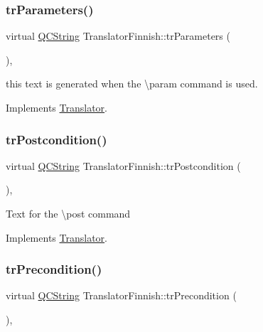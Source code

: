 \subsubsection{\texorpdfstring{trParameters()}{trParameters()}}
{\footnotesize\ttfamily virtual \mbox{\hyperlink{class_q_c_string}{Q\+C\+String}} Translator\+Finnish\+::tr\+Parameters (\begin{DoxyParamCaption}{ }\end{DoxyParamCaption})\hspace{0.3cm}{\ttfamily [inline]}, {\ttfamily [virtual]}}

this text is generated when the \textbackslash{}param command is used. 

Implements \mbox{\hyperlink{class_translator}{Translator}}.

\mbox{\label{class_translator_finnish_a3c86b722a288212c7c72bf96f4942250}} 
\subsubsection{\texorpdfstring{trPostcondition()}{trPostcondition()}}
{\footnotesize\ttfamily virtual \mbox{\hyperlink{class_q_c_string}{Q\+C\+String}} Translator\+Finnish\+::tr\+Postcondition (\begin{DoxyParamCaption}{ }\end{DoxyParamCaption})\hspace{0.3cm}{\ttfamily [inline]}, {\ttfamily [virtual]}}

Text for the \textbackslash{}post command 

Implements \mbox{\hyperlink{class_translator}{Translator}}.

\mbox{\label{class_translator_finnish_aa303b9aa448b18515e9e79b4a0a6c924}} 
\subsubsection{\texorpdfstring{trPrecondition()}{trPrecondition()}}
{\footnotesize\ttfamily virtual \mbox{\hyperlink{class_q_c_string}{Q\+C\+String}} Translator\+Finnish\+::tr\+Precondition (\begin{DoxyParamCaption}{ }\end{DoxyParamCaption})\hspace{0.3cm}{\ttfamily [inline]}, {\ttfamily [virtual]}}

